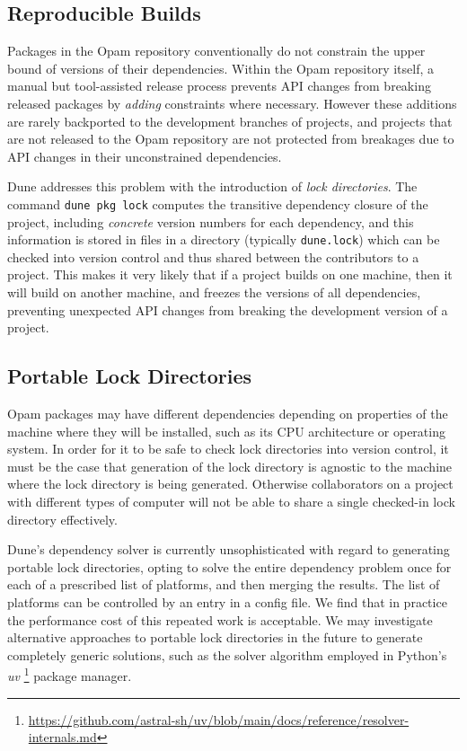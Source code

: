 \documentclass{article}
\begin{document}
\begin{multicols}{2}
        \section {Reproducible Builds}

        Packages in the Opam repository conventionally do not constrain the
        upper bound of versions of their dependencies. Within the Opam
        repository itself, a manual but tool-assisted release process prevents
        API changes from breaking released packages by \textit{adding}
        constraints where necessary. However these additions are rarely
        backported to the development branches of projects, and projects that
        are not released to the Opam repository are not protected from breakages
        due to API changes in their unconstrained dependencies.

        Dune addresses this problem with the introduction of \textit{lock
        directories}. The command \texttt{dune pkg lock} computes the transitive
        dependency closure of the project, including \textit{concrete} version
        numbers for each dependency, and this information is stored in files in
        a directory (typically \texttt{dune.lock}) which can be checked into
        version control and thus shared between the contributors to a project.
        This makes it very likely that if a project builds on one machine, then
        it will build on another machine, and freezes the versions of all
        dependencies, preventing unexpected API changes from breaking the
        development version of a project.

        \subsection {Portable Lock Directories}

        Opam packages may have different dependencies depending on properties of
        the machine where they will be installed, such as its CPU architecture
        or operating system. In order for it to be safe to check lock
        directories into version control, it must be the case that generation of
        the lock directory is agnostic to the machine where the lock directory
        is being generated. Otherwise collaborators on a project with different
        types of computer will not be able to share a single checked-in lock
        directory effectively.

        Dune's dependency solver is currently unsophisticated with regard to
        generating portable lock directories, opting to solve the entire
        dependency problem once for each of a prescribed list of platforms, and
        then merging the results. The list of platforms can be controlled by an
        entry in a config file. We find that in practice the performance cost of
        this repeated work is acceptable. We may investigate alternative
        approaches to portable lock directories in the future to
        generate completely generic solutions, such as the solver algorithm
        employed in Python's \textit{uv}
        \footnote{\url{https://github.com/astral-sh/uv/blob/main/docs/reference/resolver-internals.md}}
        package manager.


\end{multicols}
\end{document}
